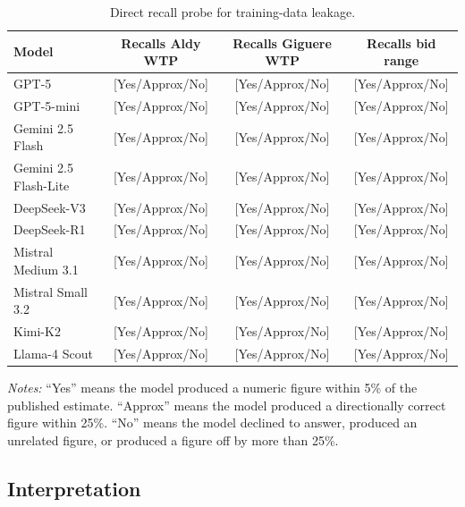 \documentclass[12pt]{article}
\begin{document}
\begin{table}[h]
    \centering
    \caption{Direct recall probe for training-data leakage.}
    \label{tab:leakage}
    \begin{threeparttable}
    \footnotesize
    \begin{tabular}{lccc}
        \toprule
        Model & Recalls Aldy WTP & Recalls Giguere WTP & Recalls bid range \\
        \midrule
        GPT-5                  & [Yes/Approx/No] & [Yes/Approx/No] & [Yes/Approx/No] \\
        GPT-5-mini             & [Yes/Approx/No] & [Yes/Approx/No] & [Yes/Approx/No] \\
        Gemini 2.5 Flash       & [Yes/Approx/No] & [Yes/Approx/No] & [Yes/Approx/No] \\
        Gemini 2.5 Flash-Lite  & [Yes/Approx/No] & [Yes/Approx/No] & [Yes/Approx/No] \\
        DeepSeek-V3            & [Yes/Approx/No] & [Yes/Approx/No] & [Yes/Approx/No] \\
        DeepSeek-R1            & [Yes/Approx/No] & [Yes/Approx/No] & [Yes/Approx/No] \\
        Mistral Medium 3.1     & [Yes/Approx/No] & [Yes/Approx/No] & [Yes/Approx/No] \\
        Mistral Small 3.2      & [Yes/Approx/No] & [Yes/Approx/No] & [Yes/Approx/No] \\
        Kimi-K2                & [Yes/Approx/No] & [Yes/Approx/No] & [Yes/Approx/No] \\
        Llama-4 Scout          & [Yes/Approx/No] & [Yes/Approx/No] & [Yes/Approx/No] \\
        \bottomrule
    \end{tabular}
    \begin{tablenotes}\footnotesize
        \item \textit{Notes:} ``Yes'' means the model produced a numeric figure within 5\% of the published estimate. ``Approx'' means the model produced a directionally correct figure within 25\%. ``No'' means the model declined to answer, produced an unrelated figure, or produced a figure off by more than 25\%.
    \end{tablenotes}
    \end{threeparttable}
\end{table}

\subsection{Interpretation}
\end{document}
